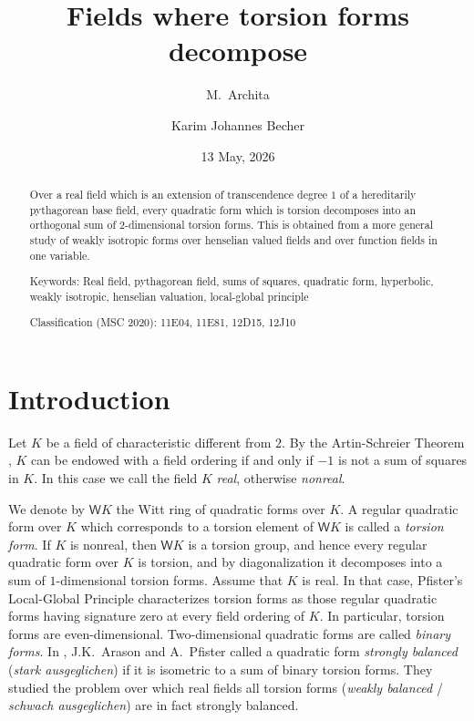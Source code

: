 \documentclass[twoside,11pt]{amsart}
\title[Fields where torsion forms are strongly balanced]{Fields where torsion forms decompose} %
\date{13 May, 2026}
\author{M.~Archita}
\author{Karim Johannes Becher}
\numberwithin{equation}{section}
\theoremstyle{definition}
\newcommand{\W}{\mathsf{W}}
\begin{document}
\begin{abstract}
Over a real field which is an extension of transcendence degree $1$ of a hereditarily pythagorean base field, every quadratic form which is torsion decomposes into an orthogonal sum of $2$-dimensional torsion forms. 
This is obtained from a more general study of  weakly isotropic forms over henselian valued fields and over function fields in one variable.

\medskip\noindent
{\sc Keywords:} 
Real field, pythagorean field, sums of squares, quadratic form, hyperbolic, weakly isotropic, henselian valuation, local-global principle

\medskip\noindent
{\sc Classification (MSC 2020):} 11E04, %
11E81, %
12D15, %
12J10 %
\end{abstract}

\maketitle

\section{Introduction}


Let $K$ be a field of characteristic different from $2$.
By the Artin-Schreier Theorem \cite[Chap.~VIII, Theorem 1.10]{Lam05}, $K$ can be endowed with a field ordering if and only if  $-1$ is not a sum of squares in $K$. In this case we call the field $K$ \emph{real}, otherwise \emph{nonreal}.

We denote by $\W K$ the Witt ring of quadratic forms over $K$.
A regular quadratic form over $K$ which corresponds to a torsion element of $\W K$ is called a \emph{torsion form}.
If $K$ is nonreal, then  $\W K$ is a torsion group, and hence every regular quadratic form over $K$ is torsion, and by diagonalization it decomposes into a sum of $1$-dimensional torsion forms. Assume that $K$ is real.
In that case, Pfister's Local-Global Principle \cite[Chap.~VIII, Theorem~3.2]{Lam05} characterizes torsion forms as those regular quadratic forms having signature zero at every field ordering of $K$.
In particular, torsion forms are even-dimensional. 
Two-dimensional quadratic forms are called \emph{binary forms}. 
In \cite{AP77}, J.K.~Arason and A.~Pfister called a quadratic form \emph{strongly balanced} (\emph{stark ausgeglichen}) if it is isometric to a sum of binary torsion forms.
They studied the problem over which real fields all torsion forms (\emph{weakly balanced} / \emph{schwach ausgeglichen}) are in fact strongly balanced.
\end{document}
